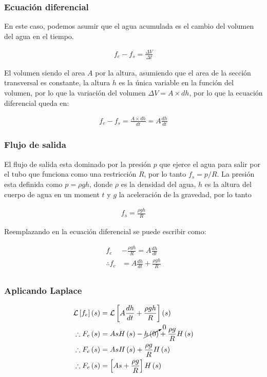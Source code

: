 \documentclass{article}
\begin{document}
\subsubsection*{Ecuación diferencial}

En este caso, podemos asumir que el agua acumulada es el cambio del volumen del agua en el tiempo.

\begin{align*}
    f_e - f_s = \frac{\Delta V}{\Delta t}
\end{align*}

El volumen siendo el area $A$ por la altura, asumiendo que el area de la sección transversal es constante, la altura $h$ es la única variable en la función del volumen, por lo que la variación del volumen $\Delta V = A \times d h$, por lo que la ecuación diferencial queda en:

\begin{align*}
    f_e - f_s = \frac{A \times d h}{d t} = A \frac{d h}{d t}
\end{align*}

\subsubsection*{Flujo de salida}

El flujo de salida esta dominado por la presión $p$ que ejerce el agua para salir por el tubo que funciona como una restricción $R$, por lo tanto $f_s = p/R$. La presión esta definida como $p = \rho gh$, donde $\rho$ es la densidad del agua, $h$ es la altura del cuerpo de agua en un moment $t$ y $g$ la aceleración de la gravedad, por lo tanto

\begin{align*}
    f_s = \frac{\rho gh}{R}
\end{align*}

Reemplazando en la ecuación diferencial se puede escribir como:

\begin{align*}
    f_e &- \frac{\rho gh}{R} = A \frac{dh}{dt}\\
    \therefore f_e &= A \frac{dh}{dt} + \frac{\rho gh}{R}\\
\end{align*}

\subsubsection*{Aplicando Laplace}

\begin{align*}
    \mathcal{L}\left[f_e\right]\left(s\right) &= \mathcal{L}\left[A \frac{dh}{dt} + \frac{\rho gh}{R}\right]\left(s\right) \\
    \therefore F_e\left(s\right) &= AsH\left(s\right) - \cancelto{0}{h\left(0\right)} + \frac{\rho g}{R}H\left(s\right) \\
    \therefore F_e\left(s\right) &= AsH\left(s\right) + \frac{\rho g}{R}H\left(s\right) \\
    \therefore \label{eq:3} F_e\left(s\right) &= \left[As + \frac{\rho g}{R}\right]H\left(s\right)
\end{align*}
\end{document}
